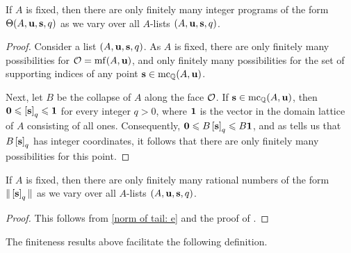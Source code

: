 \documentclass[11pt]{amsart}
\begin{document}

\begin{lemma} 
\label{finitely many secondary programs: L} 
If $A$ is fixed, then there are only finitely many integer programs of the form $\Theta(A, \mathbf{u}, \mathbf{s}, q)$ as we vary over all $A$-lists $(A, \mathbf{u}, \mathbf{s}, q)$.
\end{lemma}

\begin{proof}  Consider a list $(A, \mathbf{u}, \mathbf{s}, q)$.  As $A$ is fixed, there are only finitely many possibilities for $\mathcal{O} = \operatorname{mf}(A, \mathbf{u})$, and only finitely many possibilities for the set of supporting indices of any point $\mathbf{s} \in \operatorname{mc}_{\mathbb{Q}}(A ,\mathbf{u})$.  

Next, let $B$ be the collapse of $A$ along the face $\mathcal{O}$.  If $\mathbf{s} \in \operatorname{mc}_{\mathbb{Q}}(A, \mathbf{u})$, then $\mathbf{0} \leqslant \left[ \mathbf{s} \right]_q \leqslant \mathbf{1}$ for every integer $q > 0$, where $\mathbf{1}$ is the vector in the domain lattice of $A$ consisting of all ones.  Consequently, $\mathbf{0} \leqslant B \left[ \mathbf{s} \right]_q \leqslant B \mathbf{1}$, and as  tells us that $B \left[ \mathbf{s} \right]_q$ has integer coordinates, it follows that there are only finitely many possibilities for this point.
 \end{proof}

\begin{corollary} 
\label{finitely many coord sums: C}
 If $A$ is fixed, then there are only finitely many rational numbers of the form $ \| \left[ \mathbf{s} \right]_q \|$ as we vary over all $A$-lists $(A, \mathbf{u}, \mathbf{s}, q)$.  
\end{corollary}

\begin{proof}  This follows from \eqref{norm of tail: e} and the proof of .
\end{proof}


The finiteness results above facilitate the following definition.



\end{document}
